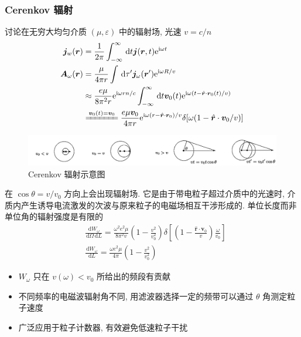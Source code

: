 \documentclass[12pt,a4paper]{article}%
\numberwithin{equation}{section}%
\renewcommand*{\vec}[1]{\bm{#1}}%
\newcommand{\dif}{\,\mathrm d}
\newcommand\mi{\mathrm{i}}
\newcommand\e{\mathrm{e}}%
\newcommand*{\uvec}[1]{\hat{\vec{#1}}}
\begin{document}
\subsubsection{Cerenkov 辐射} %
讨论在无穷大均匀介质 $(\mu,\varepsilon)$ 中的辐射场, 光速 $v = c/n$
\begin{align}
    \vec j_w(\vec r) &= \frac 1{2\pi}\int_{-\infty}^\infty\dif t\vec j(\vec r,t)\e^{\mi\omega t} \\
    \vec A_\omega(\vec r) &= \frac{\mu}{4\pi r}\int\dif\tau'\vec j_\omega(\vec r')\e^{\mi\omega R/v} \\
    &\approx \frac{e\mu}{8\pi^2 r}\e^{\mi\omega r n/c}\int_{-\infty}^\infty \dif t\vec v_0(t)\e^{\mi\omega(t-\uvec r\cdot \vec r_0(t) /v)} \\
    &\xlongequal{\vec v_0(t) = \vec v_0} \frac{e\mu\vec v_0}{4\pi r}\e^{\mi\omega(r-\uvec r\cdot\vec r_0)/v}\delta[\omega(1-\uvec r\cdot\vec v_0/v)]
\end{align}
\label{ssub:cerenkov_radiation}
\begin{figure}[hbt]
 \includegraphics[width = \linewidth]{Cerenkov.jpg}
 \caption{Cerenkov 辐射示意图\label{fig:Cerenkov}}
\end{figure}
在 $\cos\theta = v/v_0$ 方向上会出现辐射场. 它是由于带电粒子超过介质中的光速时, 介质内产生诱导电流激发的次波与原来粒子的电磁场相互干涉形成的. 单位长度而非单位角的辐射强度是有限的
\begin{align}
    &\frac{\dif W_\omega}{\dif\Omega\dif L} = \frac{\omega^2 e^2\mu}{8\pi^2 v}\left(1-\frac{v^2}{v_0^2}\right)\delta\left[\left(1-\frac{\uvec r\cdot\vec v_0}{v}\right)\frac\omega{v_0}\right] \\
    &\frac{\dif W_\omega}{\dif L} = \frac{\omega e^2\mu}{4\pi }\left(1-\frac{v^2}{v_0^2}\right)
\end{align}
\begin{itemize}
    \item $W_\omega$ 只在 $v(\omega)<v_0$ 所给出的频段有贡献
    \item 不同频率的电磁波辐射角不同, 用滤波器选择一定的频带可以通过 $\theta$ 角测定粒子速度
    \item 广泛应用于粒子计数器, 有效避免低速粒子干扰
\end{itemize}
\end{document}
